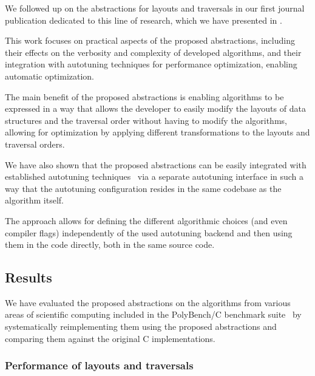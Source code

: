 We followed up on the abstractions for layouts and traversals in our first journal publication dedicated to this line of research, which we have presented in .

This work focuses on practical aspects of the proposed abstractions, including their effects on the verbosity and complexity of developed algorithms, and their integration with autotuning techniques for performance optimization, enabling automatic optimization.


The main benefit of the proposed abstractions is enabling algorithms to be expressed in a way that allows the developer to easily modify the layouts of data structures and the traversal order without having to modify the algorithms, allowing for optimization by applying different transformations to the layouts and traversal orders.

We have also shown that the proposed abstractions can be easily integrated with established autotuning techniques~\cite{ansel2014opentuner,akiba2019optuna,rasch2018atf} via a separate autotuning interface in such a way that the autotuning configuration resides in the same codebase as the algorithm itself.

The approach allows for defining the different algorithmic choices (and even compiler flags) independently of the used autotuning backend and then using them in the code directly, both in the same source code.


\subsection{Results}\label{sec:abstractions-results}

We have evaluated the proposed abstractions on the algorithms from various areas of scientific computing included in the PolyBench/C benchmark suite~\cite{polybench4.2.1} by systematically reimplementing them using the proposed abstractions and comparing them against the original C implementations.


\subsubsection{Performance of layouts and traversals}\label{sec:abstractions-performance}


